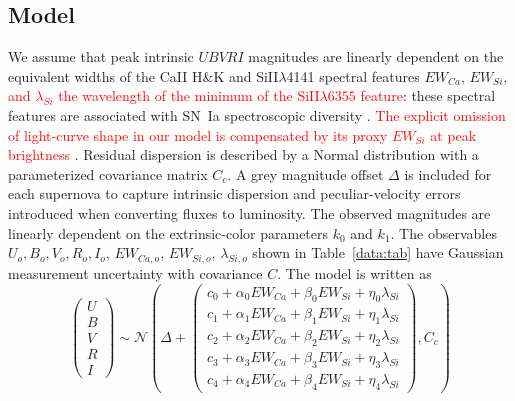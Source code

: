 \documentclass{aastex61}   	%
\begin{document}
\subsection{Model}
We assume 
that  peak intrinsic $UBVRI$ magnitudes are linearly dependent
on the
 equivalent widths of the CaII H\&K and SiII$\lambda$4141 spectral features
$EW_{Ca}$, $EW_{Si}$,
\textcolor{red}{ and $\lambda_{Si}$ the wavelength of the minimum of 
the SiII$\lambda6355$ feature}:
these spectral features are associated with SN~Ia  spectroscopic diversity  
\citep{2006PASP..118..560B, 2008A&A...492..535A, 2009A&A...500L..17B, 2009PASP..121..238B, 2009ApJ...699L.139W, 2011ApJ...729...55F}.
\textcolor{red}{
The explicit omission of light-curve shape in our model is compensated by its proxy
$EW_{Si}$ at peak brightness}
\citep{2008A&A...492..535A, 2011A&A...529L...4C}. 
Residual dispersion is described by a Normal distribution with a parameterized covariance matrix
$C_c$.  A grey magnitude offset $\Delta$ is included for each supernova
to capture intrinsic dispersion and peculiar-velocity errors introduced when converting fluxes to luminosity.
The observed magnitudes are linearly dependent on the
extrinsic-color parameters $k_0$ and $k_1$.  The observables
$U_o, B_o, V_o, R_o, I_o$, $EW_{Ca,o}$, $EW_{Si,o}$, $\lambda_{Si,o}$
shown in Table~\ref{data:tab} have Gaussian measurement uncertainty with covariance $C$.
The model is written as
\begin{equation}
\begin{pmatrix}
U\\B\\V\\R\\I
\end{pmatrix}
\sim \mathcal{N}
\left(
\Delta +
\begin{pmatrix}
c_0+\alpha_0 EW_{Ca} + \beta_0 EW_{Si} + \eta_0 \lambda_{Si} \\
c_1+\alpha_1 EW_{Ca} + \beta_1 EW_{Si} + \eta_1 \lambda_{Si}  \\
c_2+\alpha_2 EW_{Ca} + \beta_2 EW_{Si} + \eta_2 \lambda_{Si} \\
c_3+\alpha_3 EW_{Ca} + \beta_3 EW_{Si} + \eta_3 \lambda_{Si} \\
c_4+\alpha_4 EW_{Ca} + \beta_4 EW_{Si}+ \eta_4 \lambda_{Si}
\end{pmatrix}
,C_{c}
\right)
\label{ewsiv:eqn}
\end{equation}
\end{document}
